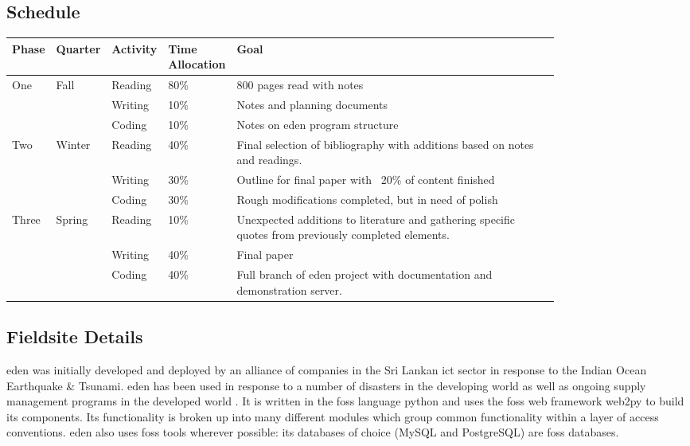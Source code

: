 \documentclass[a4paper,man,natbib]{apa6}
\begin{document}
   \subsection*{Schedule}
   \begin{center}
   \begin{tabular}{|l|l|p{0.1\linewidth}|p{0.1\linewidth}|p{0.6\linewidth}|}
   \hline
   Phase & Quarter & Activity& Time Allocation & Goal                         \\ \hline
   One   & Fall    & Reading & 80\%            & 800 pages read with notes    \\ \cline{3-5} 
         &         & Writing & 10\%            & Notes and planning documents \\ \cline{3-5} 
         &         & Coding  & 10\%            & Notes on \acrshort{eden} program structure   \\ \hline 
   Two   & Winter  & Reading & 40\%            & Final selection of bibliography with additions based on notes and readings.   \\ \cline{3-5} 
         &         & Writing & 30\%            & Outline for final paper with ~20\% of content finished \\ \cline{3-5} 
         &         & Coding  & 30\%            & Rough modifications completed, but in need of polish  \\ \hline
   Three & Spring  & Reading & 10\%            & Unexpected additions to literature and gathering specific quotes from previously completed elements.   \\ \cline{3-5} 
         &         & Writing & 40\%            & Final paper \\ \cline{3-5}
         &         & Coding  & 40\%            & Full branch of \acrshort{eden} project with documentation and demonstration server. \\ \hline
   \end{tabular}
   \end{center}

   \subsection*{Fieldsite Details}
   \acrshort{eden} was initially developed and deployed by an alliance of companies in the Sri Lankan \acrfull{ict} sector in response to the Indian Ocean Earthquake \& Tsunami. \acrshort{eden} has been used in response to a number of disasters in the developing world as well as ongoing supply management programs in the developed world \citep{Sahana_Foundation_undated-hl}. It is written in the \acrshort{foss} language \Gls{python} and uses the \acrshort{foss} \gls{web framework} web2py to build its components. Its functionality is broken up into many different modules which group common functionality within a layer of access conventions. \acrshort{eden} also uses \acrshort{foss} tools wherever possible: its databases of choice (\Gls{MySQL} and \Gls{PostgreSQL}) are \acrshort{foss} databases.
\end{document}
